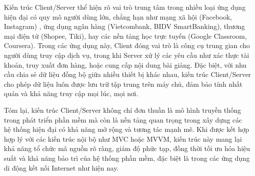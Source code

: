     
      \hspace*{0.8cm}Kiến trúc Client/Server thể hiện rõ vai trò trung tâm trong nhiều loại ứng dụng hiện đại có quy mô người dùng lớn, chẳng hạn như mạng xã hội (Facebook, Instagram) \cite{social-apps}, ứng dụng ngân hàng (Vietcombank, BIDV SmartBanking), thương mại điện tử (Shopee, Tiki), hay các nền tảng học trực tuyến (Google Classroom, Coursera). Trong các ứng dụng này, Client đóng vai trò là công cụ trung gian cho người dùng truy cập dịch vụ, trong khi Server xử lý các yêu cầu như xác thực tài khoản, truy xuất đơn hàng, hoặc cung cấp nội dung bài giảng. Đặc biệt, với nhu cầu chia sẻ dữ liệu đồng bộ giữa nhiều thiết bị khác nhau, kiến trúc Client/Server cho phép dữ liệu luôn được lưu trữ tập trung trên máy chủ, đảm bảo tính nhất quán và khả năng truy cập mọi lúc, mọi nơi.
    \vspace{0.5em}

    
      \hspace*{0.8cm}Tóm lại, kiến trúc Client/Server không chỉ đơn thuần là mô hình truyền thống trong phát triển phần mềm mà còn là nền tảng quan trọng trong xây dựng các hệ thống hiện đại có khả năng mở rộng và tương tác mạnh mẽ. Khi được kết hợp hợp lý với các kiến trúc nội bộ như MVC hoặc MVVM, kiến trúc này mang lại khả năng tổ chức mã nguồn rõ ràng, giảm độ phức tạp, đồng thời tối ưu hóa hiệu suất và khả năng bảo trì của hệ thống phần mềm, đặc biệt là trong các ứng dụng di động kết nối Internet như hiện nay.
    \vspace{0.5em}